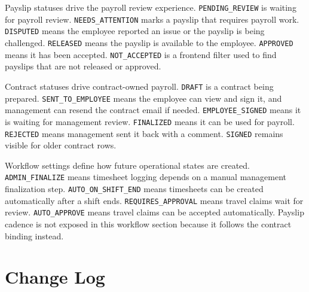 \documentclass[11pt]{article}
\newcommand{\code}[1]{\nolinkurl{#1}}
\begin{document}
Payslip statuses drive the payroll review experience. \code{PENDING_REVIEW} is waiting for payroll review. \code{NEEDS_ATTENTION} marks a payslip that requires payroll work. \code{DISPUTED} means the employee reported an issue or the payslip is being challenged. \code{RELEASED} means the payslip is available to the employee. \code{APPROVED} means it has been accepted. \code{NOT_ACCEPTED} is a frontend filter used to find payslips that are not released or approved.

Contract statuses drive contract-owned payroll. \code{DRAFT} is a contract being prepared. \code{SENT_TO_EMPLOYEE} means the employee can view and sign it, and management can resend the contract email if needed. \code{EMPLOYEE_SIGNED} means it is waiting for management review. \code{FINALIZED} means it can be used for payroll. \code{REJECTED} means management sent it back with a comment. \code{SIGNED} remains visible for older contract rows.

Workflow settings define how future operational states are created. \code{ADMIN_FINALIZE} means timesheet logging depends on a manual management finalization step. \code{AUTO_ON_SHIFT_END} means timesheets can be created automatically after a shift ends. \code{REQUIRES_APPROVAL} means travel claims wait for review. \code{AUTO_APPROVE} means travel claims can be accepted automatically. Payslip cadence is not exposed in this workflow section because it follows the contract binding instead.

\section*{Change Log}
\end{document}
